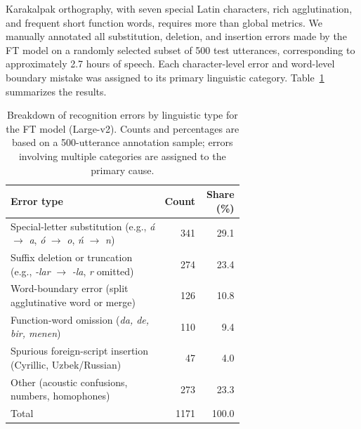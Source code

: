 \documentclass[11pt]{article}
\begin{document}
Karakalpak orthography, with seven special Latin characters, rich agglutination, and frequent short function words, requires more than global metrics. We manually annotated all substitution, deletion, and insertion errors made by the FT model on a randomly selected subset of 500 test utterances, corresponding to approximately 2.7 hours of speech. Each character-level error and word-level boundary mistake was assigned to its primary linguistic category. Table~\ref{tab:error-breakdown} summarizes the results.

\begin{table}[H]
\centering
\caption{Breakdown of recognition errors by linguistic type for the FT model (Large-v2). Counts and percentages are based on a 500-utterance annotation sample; errors involving multiple categories are assigned to the primary cause.}
\label{tab:error-breakdown}
\begin{tabular}{p{0.66\linewidth}rr}
\toprule
Error type & Count & Share (\%) \\
\midrule
Special-letter substitution (e.g., \textit{á} $\rightarrow$  \textit{a}, \textit{ó} $\rightarrow$ \textit{o}, \textit{ń} $\rightarrow$ \textit{n}) & 341 & 29.1 \\
Suffix deletion or truncation (e.g., \textit{-lar} $\rightarrow$ \textit{-la}, \textit{r} omitted) & 274 & 23.4 \\
Word-boundary error (split agglutinative word or merge) & 126 & 10.8 \\
Function-word omission (\textit{da, de, bir, menen}) & 110 & 9.4 \\
Spurious foreign-script insertion (Cyrillic, Uzbek/Russian) & 47 & 4.0 \\
Other (acoustic confusions, numbers, homophones) & 273 & 23.3 \\
\midrule
Total & 1171 & 100.0 \\
\bottomrule
\end{tabular}
\end{table}
\end{document}
